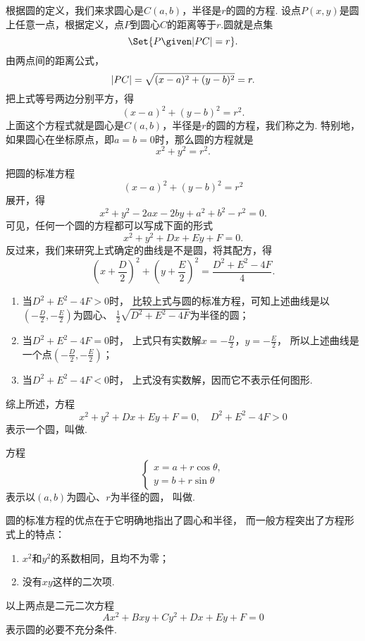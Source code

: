 根据圆的定义，我们来求圆心是\(C(a,b)\)，半径是\(r\)的圆的方程.
设点\(P(x,y)\)是圆上任意一点，根据定义，点\(P\)到圆心\(C\)的距离等于\(r\).圆就是点集\[
	\Set{ P \given \abs{PC} = r }.
\]
由两点间的距离公式，\[
	\abs{PC} = \sqrt{(x-a)^2+(y-b)^2} = r.
\]
把上式等号两边分别平方，得\begin{equation}
	(x-a)^2+(y-b)^2 = r^2.
\end{equation}上面这个方程式就是圆心是\(C(a,b)\)，半径是\(r\)的圆的方程，我们称之为.
特别地，如果圆心在坐标原点，即\(a=b=0\)时，那么圆的方程就是\begin{equation}
x^2+y^2 = r^2.
\end{equation}

把圆的标准方程\[
	(x-a)^2+(y-b)^2 = r^2
\]
展开，得\[
	x^2 + y^2 - 2ax - 2by + a^2 + b^2 - r^2 = 0.
\]
可见，任何一个圆的方程都可以写成下面的形式\[
	x^2 + y^2 + Dx + Ey + F = 0.
\]
反过来，我们来研究上式确定的曲线是不是圆，将其配方，得\[
\left(x+\frac{D}{2}\right)^2+\left(y+\frac{E}{2}\right)^2 = \frac{D^2+E^2-4F}{4}.
\]\begin{enumerate}
	\item 当\(D^2+E^2-4F > 0\)时，
	比较上式与圆的标准方程，可知上述曲线是以\((-\frac{D}{2},-\frac{E}{2})\)为圆心、
	\(\frac{1}{2} \sqrt{D^2+E^2-4F}\)为半径的圆；

	\item 当\(D^2+E^2-4F = 0\)时，
	上式只有实数解\(x=-\frac{D}{2}\)，\(y=-\frac{E}{2}\)，
	所以上述曲线是一个点\((-\frac{D}{2},-\frac{E}{2})\)；

	\item 当\(D^2+E^2-4F < 0\)时，
	上式没有实数解，因而它不表示任何图形.
\end{enumerate}
综上所述，方程\begin{equation}
	x^2 + y^2 + Dx + Ey + F = 0,
	\quad
	D^2+E^2-4F > 0
\end{equation}
表示一个圆，叫做.

方程\begin{equation}
	\left\{ \begin{array}{l}
		x = a + r \cos\theta, \\
		y = b + r \sin\theta
	\end{array} \right.
\end{equation}
表示以\((a,b)\)为圆心、\(r\)为半径的圆，
叫做.

圆的标准方程的优点在于它明确地指出了圆心和半径，
而一般方程突出了方程形式上的特点：\begin{enumerate}
	\item \(x^2\)和\(y^2\)的系数相同，且均不为零；
	\item 没有\(xy\)这样的二次项.
\end{enumerate}
以上两点是二元二次方程\[
	A x^2 + B xy + C y^2 + D x + E y + F = 0
\]表示圆的必要不充分条件.

